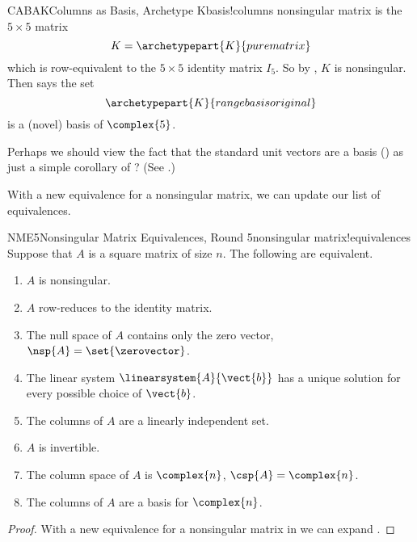 %
\begin{example}{CABAK}{Columns as Basis, Archetype K}{basis!columns nonsingular matrix}
 is the $5\times 5$ matrix
%
\begin{equation*}
K=\archetypepart{K}{purematrix}
\end{equation*}
%
which is row-equivalent to the $5\times 5$ identity matrix $I_5$.  So by , $K$ is nonsingular.  Then  says the set
%
\begin{equation*}
\archetypepart{K}{rangebasisoriginal}
\end{equation*}
%
is a (novel) basis of $\complex{5}$.
%
\end{example}
%
Perhaps we should view the fact that the standard unit vectors are a basis () as just a simple corollary of ?  (See .)\par
%
With a new equivalence for a nonsingular matrix, we can update our list of equivalences.
%
\begin{theorem}{NME5}{Nonsingular Matrix Equivalences, Round 5}{nonsingular matrix!equivalences}
Suppose that $A$ is a square matrix of size $n$.  The following are equivalent.
%
\begin{enumerate}
\item $A$ is nonsingular.
\item $A$ row-reduces to the identity matrix.
\item The null space of $A$ contains only the zero vector, $\nsp{A}=\set{\zerovector}$.
\item The linear system $\linearsystem{A}{\vect{b}}$ has a unique solution for every possible choice of $\vect{b}$.
\item The columns of $A$ are a linearly independent set.
\item $A$ is invertible.
\item The column space of $A$ is $\complex{n}$, $\csp{A}=\complex{n}$.
\item The columns of $A$ are a basis for $\complex{n}$.
\end{enumerate}
\end{theorem}
%
\begin{proof}
With a new equivalence for a nonsingular matrix in  we can expand .
\end{proof}
%
